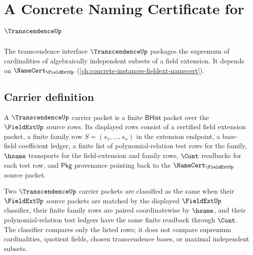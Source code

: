 \chapter{A Concrete Naming Certificate for $\TranscendenceUp$}
\label{ch:concrete-instances-transcendence-namecert}

The transcendence interface $\TranscendenceUp$ packages the supremum of cardinalities of algebraically independent subsets of a field extension. It depends on $\NameCert_{\FieldExtUp}$ (\autoref{ch:concrete-instances-fieldext-namecert}).

\section{Carrier definition}
\label{sec:transcendence-carrier}

\begin{definition}\label{def:transcendence-bhist-carrier}
A $\TranscendenceUp$ carrier packet is a finite $\mathsf{BHist}$ packet over
the $\FieldExtUp$ source rows. Its displayed rows consist of a certified field
extension packet, a finite family row $S=(s_1,\ldots,s_n)$ in the extension
endpoint, a base-field coefficient ledger, a finite list of polynomial-relation
test rows for the family, $\hsame$ transports for the field-extension and family
rows, $\Cont$ readbacks for each test row, and $\mathsf{Pkg}$ provenance pointing
back to the $\NameCert_{\FieldExtUp}$ source packet.
\end{definition}

\begin{definition}\label{def:transcendence-classifier}
Two $\TranscendenceUp$ carrier packets are classified as the same when their
$\FieldExtUp$ source packets are matched by the displayed $\FieldExtUp$
classifier, their finite family rows are paired coordinatewise by $\hsame$, and
their polynomial-relation test ledgers have the same finite readback through
$\Cont$. The classifier compares only the listed rows; it does not compare
supremum cardinalities, quotient fields, chosen transcendence bases, or maximal
independent subsets.
\end{definition}

